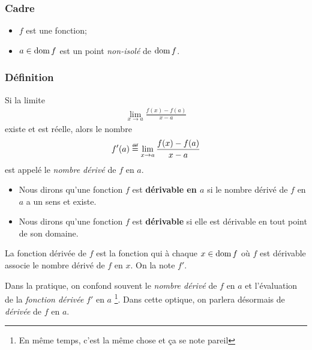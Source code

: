 \documentclass[main.tex]{subfiles}
\begin{document}
\begin{definition}

    \subsubsection*{Cadre}

    \begin{itemize}
        \item $f$ est une fonction;
        \item $a \in \operatorname{dom} f$ est un point \emph{non-isolé} de $\operatorname{dom} f$.
    \end{itemize}

    \subsubsection*{Définition}

    Si la limite
    \begin{align}
        \lim_{x \to a} \frac {f(x) - f(a)} {x - a}
    \end{align}
    existe et est réelle,
    alors le nombre
    \begin{align}
        f'(a) \defeq \lim_{x \to a} \frac {f(x) - f(a)} {x - a}
    \end{align}
    est appelé le \emph{nombre dérivé} de $f$ en $a$.
\end{definition}

\begin{remark}
    [Dérivabilité]

    \begin{itemize}
        \item Nous dirons qu'une fonction $f$ est \textbf{dérivable en $a$}
            si le nombre dérivé de $f$ en $a$ a un sens et existe.
        \item Nous dirons qu'une fonction $f$ est \textbf{dérivable}
            si elle est dérivable en tout point de son domaine.
    \end{itemize}
\end{remark}

\begin{definition}
    
    La fonction dérivée de $f$ est la fonction qui à chaque $x \in \operatorname{dom} f$ où $f$ est dérivable
    associe le nombre dérivé de $f$ en $x$.
    On la note $f'$.
\end{definition}

\begin{remark}
    [Terminologie]

    Dans la pratique, on confond souvent le \emph{nombre dérivé} de $f$ en $a$
    et l'évaluation de la \emph{fonction dérivée} $f'$ en $a$
    \footnote{En même temps, c'est la même chose et ça se note pareil}.
    Dans cette optique, on parlera désormais de \emph{dérivée} de $f$ en $a$.
\end{remark}
\end{document}
